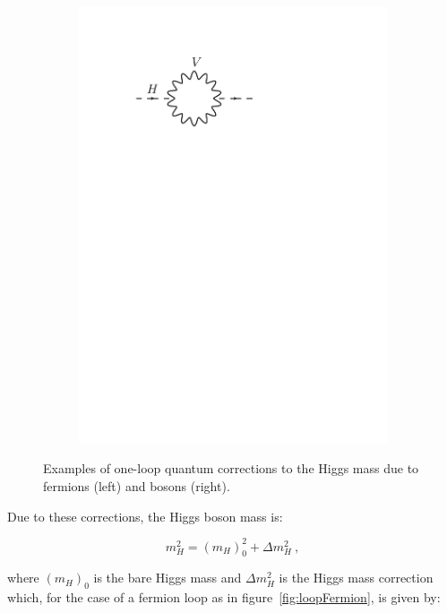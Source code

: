 \begin{figure}[!t]
\begin{subfigure}{0.49\textwidth}
      \includegraphics[width=\textwidth]{Theory/FeynmanGraphs/loopBoson.pdf}
     \caption{}
      \label{fig:loopBoson}
 \end{subfigure}
  \caption{Examples of one-loop quantum corrections to the Higgs mass due to fermions (left) and bosons (right).}
\end{figure}

Due to these corrections, the Higgs boson mass is:

\begin{equation} 
  m_H^2 = (m_H)_{0}^{2} + \Delta m_H^2~,
  \label{eq:HiggsMassTotal}
\end{equation}

\noindent where $(m_H)_0$ is the bare Higgs mass and $\Delta m_H^2$ is the Higgs mass correction which, for the case of a fermion loop as in figure~\ref{fig:loopFermion}, is given by:

